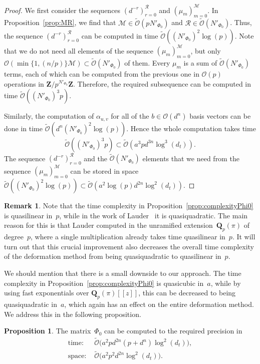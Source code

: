 \documentclass[a4paper,11pt]{article}
\numberwithin{equation}{section}
\newcommand{\ZZ}{\mathbf{Z}} %
\newcommand{\QQ}{\mathbf{Q}} %
\providecommand{\BigOh}{\mathcal{O}}          %
\providecommand{\SoftOh}{\tilde{\mathcal{O}}} %
\theoremstyle{definition}
\newtheorem{prop}[thm]{Proposition}
\newtheorem{rem}[thm]{Remark}
\begin{document}
\begin{proof}
We first consider the 
sequences $(d^{-r})_{r=0}^{\mathcal{R}}$ and $(\mu_m)_{m=0}^{\mathcal{M}}$. 
In Proposition~\ref{prop:MR}, we find that 
$\mathcal{M} \in \SoftOh(p N'_{\Phi_0})$ and 
$\mathcal{R} \in \SoftOh(N'_{\Phi_0})$.  Thus, the sequence 
$(d^{-r})_{r=0}^{\mathcal{R}}$ can be computed in time 
$\SoftOh((N'_{\Phi_0})^2 \log(p))$.  Note that we do not 
need all elements of the sequence $( \mu_{m} )_{m=0}^{\mathcal{M}}$, but only 
$\BigOh( \min \{ 1,(n/p) \} \mathcal{M} ) \subset \SoftOh(N'_{\Phi_0})$ 
of them.  Every $\mu_m$ is a sum of $\SoftOh(N'_{\Phi_0})$ terms, each 
of which can be computed from the previous one in $\BigOh(p)$ operations in 
$\ZZ/p^{N'_{\Phi_0}}\ZZ$.  Therefore, the required subsequence can be 
computed in time $\SoftOh((N'_{\Phi_0})^3 p)$.

Similarly, the computation of $\alpha_{u,v}$ for all of the 
$b \in \BigOh(d^n)$ basis vectors can be done in time 
$\SoftOh(d^n (N'_{\Phi_0})^2 \log(p))$.  Hence the whole computation 
takes time 
\[
\SoftOh((N'_{\Phi_0})^3 p) \subset \SoftOh(a^3 p d^{3n} \log^3(d_t)).
\]
The sequence $(d^{-r})_{r=0}^{\mathcal{R}}$ and the 
$\SoftOh(N'_{\Phi_0})$ elements that we need from the sequence 
$(\mu_{m})_{m=0}^{\mathcal{M}}$ can be stored in space 
$\SoftOh((N'_{\Phi_0})^2 \log (p)) \subset \SoftOh(a^2 \log(p) d^{2n} \log^2(d_t))$.
\end{proof}

\begin{rem}
Note that the time complexity in Proposition~\ref{prop:complexityPhi0} 
is quasilinear in~$p$, while in the work of Lauder~\citep{Lauder2004a} 
it is quasiquadratic.  The main reason for this is that Lauder computed 
in the unramified extension~$\QQ_p(\pi)$ of degree~$p$, where a single 
multiplication already takes time quasilinear in~$p$.  It will turn out 
that this crucial improvement also decreases the overall time complexity 
of the deformation method from being quasiquadratic to quasilinear in~$p$.

We should mention that there is a small downside to our approach.  The time 
complexity in Proposition~\ref{prop:complexityPhi0} is quasicubic in~$a$, 
while by using fast exponentials over $\QQ_p(\pi)[[z]]$, this can be 
decreased to being quasiquadratic in~$a$, which again has an effect on the 
entire deformation method.  We address this in the following proposition.
\end{rem}

\begin{prop} \label{prop:compPhi0}
The matrix~$\Phi_0$ can be computed to the required precision in 
\begin{align*}
\mbox{time: }  &\SoftOh\bigl(a^2 p d^{2n} (p + d^n) \log^2(d_t) \bigr), \\
\mbox{space: } &\SoftOh\bigl(a^2 p^2 d^{2n} \log^2(d_t)\bigr).
\end{align*}
\end{prop}
\end{document}
